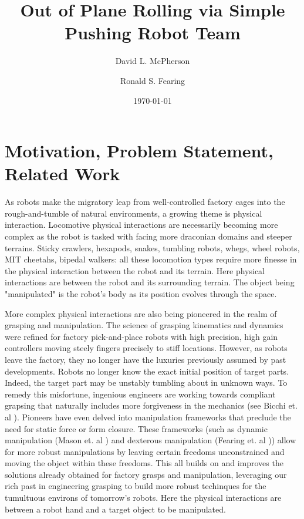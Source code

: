 \documentclass[a4paper]{article}
\title{Out of Plane Rolling via Simple Pushing Robot Team}
\author{David L. McPherson \and Ronald S. Fearing}
\date{\today}
\begin{document}
\maketitle

\section{Motivation, Problem Statement, Related Work}

As robots make the migratory leap from well-controlled factory cages into the rough-and-tumble of natural environments, a growing theme is physical interaction.
Locomotive physical interactions are necessarily becoming more complex as the robot is tasked with facing more draconian domains and steeper terrains.
Sticky crawlers, hexapods, snakes, tumbling robots, whegs, wheel robots, MIT cheetahs, bipedal walkers: all these locomotion types require more finesse in the physical interaction between the robot and its terrain.
Here physical interactions are between the robot and its surrounding terrain.
The object being "manipulated" is the robot's body as its position evolves through the space.

More complex physical interactions are also being pioneered in the realm of grasping and manipulation.
The science of grasping kinematics and dynamics were refined for factory pick-and-place robots with high precision, high gain controllers moving steely fingers precisely to stiff locations.
However, as robots leave the factory, they no longer have the luxuries previously assumed by past developments.
Robots no longer know the exact initial position of target parts.
Indeed, the target part may be unstably tumbling about in unknown ways.
To remedy this misfortune, ingenious engineers are working towards compliant grapsing that naturally includes more forgiveness in the mechanics (see Bicchi et. al \cite{BicchiCompliant}).
Pioneers have even delved into manipulation frameworks that preclude the need for static force or form closure.
These frameworks (such as dynamic manipulation (Mason et. al \cite{Lynch01011999}) and dexterous manipulation (Fearing et. al \cite{fearing1986simplified})) allow for more robust manipulations by leaving certain freedoms unconstrained and moving the object within these freedoms.
This all builds on and improves the solutions already obtained for factory grasps and manipulation, leveraging our rich past in engineering grasping to build more robust techinques for the tumultuous environs of tomorrow's robots.
Here the physical interactions are between a robot hand and a target object to be manipulated.
\end{document}
